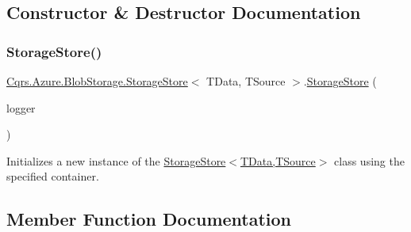 \subsection{Constructor \& Destructor Documentation}
\mbox{\label{classCqrs_1_1Azure_1_1BlobStorage_1_1StorageStore_ae7a725cdcb7de73e097b02c19463bae7_ae7a725cdcb7de73e097b02c19463bae7}} 
\subsubsection{\texorpdfstring{Storage\+Store()}{StorageStore()}}
{\footnotesize\ttfamily \hyperlink{classCqrs_1_1Azure_1_1BlobStorage_1_1StorageStore}{Cqrs.\+Azure.\+Blob\+Storage.\+Storage\+Store}$<$ T\+Data, T\+Source $>$.\hyperlink{classCqrs_1_1Azure_1_1BlobStorage_1_1StorageStore}{Storage\+Store} (\begin{DoxyParamCaption}\item[{I\+Logger}]{logger }\end{DoxyParamCaption})\hspace{0.3cm}{\ttfamily [protected]}}



Initializes a new instance of the \hyperlink{classCqrs_1_1Azure_1_1BlobStorage_1_1StorageStore_ae7a725cdcb7de73e097b02c19463bae7_ae7a725cdcb7de73e097b02c19463bae7}{Storage\+Store$<$\+T\+Data,\+T\+Source$>$} class using the specified container. 



\subsection{Member Function Documentation}
\mbox{\label{classCqrs_1_1Azure_1_1BlobStorage_1_1StorageStore_af56bdbd7fa6650aaef5c0bab9ed55f1a_af56bdbd7fa6650aaef5c0bab9ed55f1a}} 
